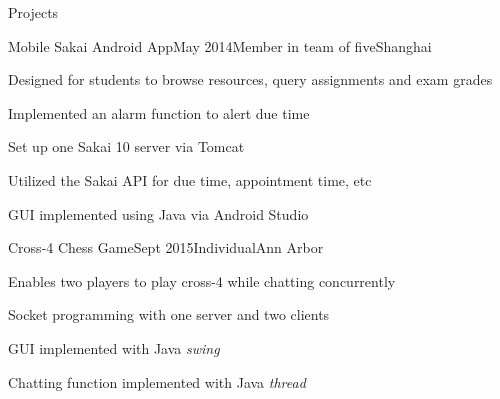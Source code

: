 \documentclass{resume} %
\begin{document}
\begin{rSection}{Projects}

	\begin{rSubsection}{Mobile Sakai Android App}{May 2014}{Member in team of five}{Shanghai}
	\item Designed for students to browse resources, query assignments and exam grades
	\item Implemented an alarm function to alert due time
	\item Set up one Sakai 10 server via Tomcat
	\item Utilized the Sakai API for due time, appointment time, etc
	\item GUI implemented using Java via Android Studio
	\end{rSubsection}
	
	
	\begin{rSubsection}{Cross-4 Chess Game}{Sept 2015}{Individual}{Ann Arbor}
		\item Enables two players to play cross-4 while chatting concurrently
		\item Socket programming with one server and two clients
		\item GUI implemented with Java \textit{swing}
		\item Chatting function implemented with Java \textit{thread}		
	\end{rSubsection}

\end{rSection}
%
%	
\end{document}

